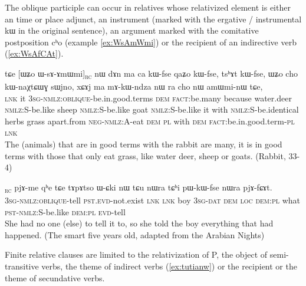 \documentclass[oldfontcommands,oneside,a4paper,11pt]{article}
\newcommand{\ipa}[1]{{\phon #1}} %
\newcommand{\topic}{\textsc{dem}}
\newcommand{\rc}{\textsubscript{\textsc{rc}}}
\begin{document}
The oblique participle can occur in relatives whose relativized element is either an time or place adjunct, an instrument (marked with the ergative / instrumental \ipa{kɯ} in the original sentence), an argument marked with the comitative postposition \ipa{cʰo} (example \ref{ex:WsAmWmi}) or the recipient of an indirective verb (\ref{ex:WsAfCAt}).

     \begin{exe}
   \ex \label{ex:WsAmWmi}
 \gll 
\ipa{tɕe}   	[\ipa{ɯʑo}   	\ipa{ɯ-sɤ-ɤmɯmi}]\rc{}   	\ipa{nɯ}   	\ipa{dɤn}   	\ipa{ma}   	\ipa{ca}   	\ipa{kɯ-fse}   	\ipa{qaʑo}   	\ipa{kɯ-fse,}   	\ipa{tsʰɤt}   	\ipa{kɯ-fse,}   	 \ipa{ɯʑo}   	\ipa{cho}   	\ipa{kɯ-naχtɕɯɣ}   	\ipa{sɯjno,}   	\ipa{xɕɤj}   	\ipa{ma}   	\ipa{mɤ-kɯ-ndza}   	\ipa{nɯ} \ipa{ra}   	\ipa{cho}   	\ipa{nɯ}   	\ipa{amɯmi-nɯ}   	\ipa{tɕe,}   \\
\textsc{lnk} it \textsc{3sg-nmlz:oblique}-be.in.good.terms \topic{} \textsc{fact:}be.many because water.deer \textsc{nmlz:S}-be.like sheep \textsc{nmlz:S}-be.like goat  \textsc{nmlz:S}-be.like it with  \textsc{nmlz:S}-be.identical herbs grass apart.from \textsc{neg-nmlz:A}-eat \textsc{dem} \textsc{pl} with \textsc{dem} \textsc{fact}:be.in.good.term-\textsc{pl} \textsc{lnk} \\
\glt The (animals) that are in good terms with the rabbit are many, it is in good terms with those that only eat grass, like water deer, sheep or goats. (Rabbit, 33-4)
\end{exe}

\begin{exe}
\ex \label{ex:WsAfCAt}
\gll
[\ipa{ɯ-sɤ-fɕɤt}]\rc{} 
\ipa{pjɤ-me} 	\ipa{qʰe} 	\ipa{tɕe} 	\ipa{tɤpɤtso} 	\ipa{ɯ-ɕki} 	\ipa{nɯ} 	\ipa{tɕu} 	\ipa{nɯra} 	\ipa{tɕʰi} 	\ipa{pɯ-kɯ-fse} 	\ipa{nɯra} 	\ipa{pjɤ-fɕɤt.} \\
\textsc{3sg-nmlz:oblique}-tell \textsc{pst.evd}-not.exist \textsc{lnk} \textsc{lnk} boy \textsc{3sg-dat} \textsc{dem} \textsc{loc} \textsc{dem:pl} what \textsc{pst-nmlz:S}-be.like  \textsc{dem:pl} \textsc{evd}-tell \\
\glt She had no one (else) to tell it to, so she told the boy everything that had happened. (The smart five years old, adapted from the Arabian Nights)
\end{exe} 

Finite relative clauses are limited to the relativization of P, the object of semi-transitive verbs, the theme of indirect verbs (\ref{ex:tutianw}) or the recipient or the theme of secundative verbs.
\end{document}
